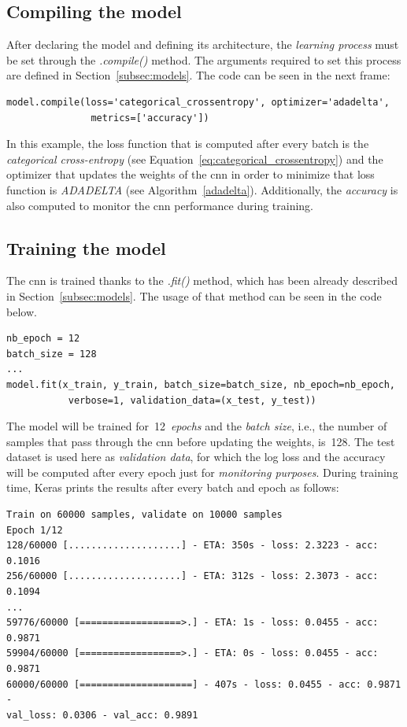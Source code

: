 \subsection{Compiling the model}
After declaring the model and defining its architecture, the \emph{learning process} must be set through the  \textit{.compile()} method. The arguments required to set this process are defined in Section~\ref{subsec:models}. The code can be seen in the next frame:
\begin{lstlisting}
model.compile(loss='categorical_crossentropy', optimizer='adadelta', 
               metrics=['accuracy'])
\end{lstlisting}

In this example, the loss function that is computed after every batch is the \emph{categorical cross-entropy} (see Equation~\ref{eq:categorical_crossentropy}) and the optimizer that updates the weights of the \gls{cnn} in order to minimize that loss function is \emph{ADADELTA} (see Algorithm~\ref{adadelta}). Additionally, the \emph{accuracy} is also computed to monitor the \gls{cnn} performance during training.

\subsection{Training the model}
The \gls{cnn} is trained thanks to the \textit{.fit()} method, which has been already described in Section~\ref{subsec:models}. The usage of that method can be seen in the code below.
\begin{lstlisting}
nb_epoch = 12
batch_size = 128
...
model.fit(x_train, y_train, batch_size=batch_size, nb_epoch=nb_epoch,
           verbose=1, validation_data=(x_test, y_test))
\end{lstlisting}

The model will be trained for~12~\emph{epochs} and the \emph{batch size}, i.e., the number of samples that pass through the \gls{cnn} before updating the weights, is~128. The test dataset is used here as \emph{validation data}, for which the log loss and the accuracy will be computed after every epoch just for \emph{monitoring purposes}. During training time, Keras prints the results after every batch and epoch as follows:
\begin{Verbatim}[frame=single]
Train on 60000 samples, validate on 10000 samples
Epoch 1/12
128/60000 [....................] - ETA: 350s - loss: 2.3223 - acc: 0.1016
256/60000 [....................] - ETA: 312s - loss: 2.3073 - acc: 0.1094
...
59776/60000 [==================>.] - ETA: 1s - loss: 0.0455 - acc: 0.9871
59904/60000 [==================>.] - ETA: 0s - loss: 0.0455 - acc: 0.9871
60000/60000 [====================] - 407s - loss: 0.0455 - acc: 0.9871 - 
val_loss: 0.0306 - val_acc: 0.9891
\end{Verbatim}


